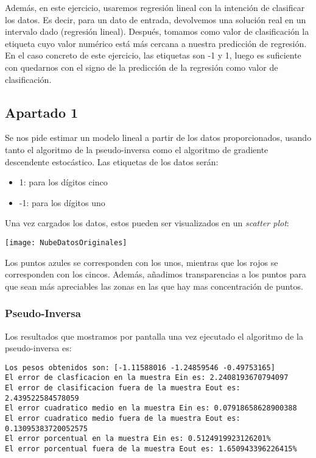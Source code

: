 \documentclass[11pt]{article}
\begin{document}
Además, en este ejercicio, usaremos regresión lineal con la intención de clasificar los datos. Es decir, para un dato de entrada, devolvemos una solución real en un intervalo dado (regresión lineal). Después, tomamos como valor de clasificación la etiqueta cuyo valor numérico está más cercana a nuestra predicción de regresión. En el caso concreto de este ejercicio, las etiquetas son -1 y 1, luego es suficiente con quedarnos con el signo de la predicción de la regresión como valor de clasificación.

\subsection{Apartado 1}

Se nos pide estimar un modelo lineal a partir de los datos proporcionados, usando tanto el algoritmo de la pseudo-inversa como el algoritmo de gradiente descendente estocástico. Las etiquetas de los datos serán:

\begin{itemize}
    \item 1: para los dígitos cinco
    \item -1: para los dígitos uno
\end{itemize}

Una vez cargados los datos, estos pueden ser visualizados en un \emph{scatter plot}:

\begin{center}
\texttt{[image: NubeDatosOriginales]}
\end{center}

Los puntos azules se corresponden con los unos, mientras que los rojos se corresponden con los cincos. Además, añadimos transparencias a los puntos para que sean más apreciables las zonas en las que hay mas concentración de puntos.

\subsubsection{Pseudo-Inversa}

Los resultados que mostramos por pantalla una vez ejecutado el algoritmo de la pseudo-inversa es:

\begin{lstlisting}
Los pesos obtenidos son: [-1.11588016 -1.24859546 -0.49753165]
El error de clasficacion en la muestra Ein es: 2.2408193670794097
El error de clasificacion fuera de la muestra Eout es: 2.439522584578059
El error cuadratico medio en la muestra Ein es: 0.07918658628900388
El error cuadratico medio fuera de la muestra Eout es: 0.13095383720052575
El error porcentual en la muestra Ein es: 0.5124919923126201%
El error porcentual fuera de la muestra Eout es: 1.650943396226415%
\end{lstlisting}
\end{document}
